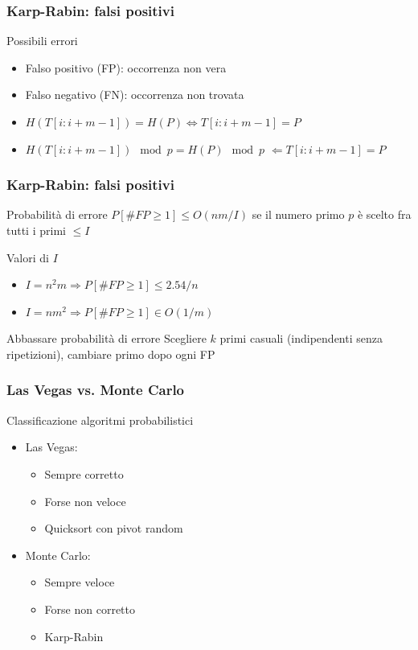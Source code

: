 \begin{frame}[fragile]
\frametitle{Karp-Rabin: falsi positivi}
\begin{block}{Possibili errori}
\begin{itemize}
\item
Falso positivo (FP): occorrenza non vera
\item
Falso negativo (FN): occorrenza non trovata
\item
$H(T[i:i+m-1])=H(P) \Leftrightarrow T[i:i+m-1]=P$
\item
$H(T[i:i+m-1])  \mod p = H(P)  \mod p$
$\Leftarrow T[i:i+m-1]=P$
\end{itemize}
\end{block}
\end{frame}


\begin{frame}[fragile]
\frametitle{Karp-Rabin: falsi positivi}
\begin{block}{Probabilità di errore}
$P[\#FP\ge 1] \le O(nm/I)$ se il numero primo $p$ è scelto fra tutti i primi $\le
I$
\end{block}

\begin{block}{Valori di $I$}
\begin{itemize}
\item
$I=n^{2}m \Rightarrow P[\#FP\ge 1] \le 2.54/n$
\item
$I=nm^{2}  \Rightarrow P[\#FP\ge 1] \in O(1/m)$
\end{itemize}
\end{block}

\begin{block}{Abbassare probabilità di errore}
Scegliere $k$ primi casuali (indipendenti senza ripetizioni), cambiare primo
dopo ogni FP
\end{block}
\end{frame}

\begin{frame}[fragile]
\frametitle{Las Vegas vs.
  Monte Carlo}
\begin{block}{Classificazione algoritmi probabilistici}
\begin{itemize}
\item
Las Vegas:
\begin{itemize}
\item
Sempre corretto
\item
Forse non veloce
\item
Quicksort con pivot random
\end{itemize}
\item
Monte Carlo:
\begin{itemize}
\item
Sempre veloce

\item
Forse non corretto
\item
Karp-Rabin
\end{itemize}
\end{itemize}
\end{block}
\end{frame}


